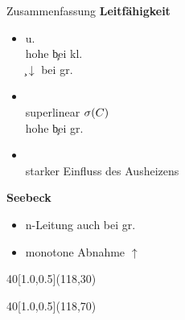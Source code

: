 \begin{frame}{Zusammenfassung}{}%
{\bfseries Leitfähigkeit}\par
\begin{itemize}
\item \CrPd u. \WPd 
\\hohe \c bei kl. \C
\\\c$\downarrow$ bei gr. \C
%
\item \dmbi \\superlinear $\c(\C)$ \\ hohe \c bei gr. \C
\item \aob \\ starker Einfluss des Ausheizens
\end{itemize}
%
\vspace*{1ex}
{\bfseries Seebeck}\par
\begin{itemize}
\item n-Leitung auch bei gr. \C
\item monotone Abnahme \Pfeil \n $\uparrow$
\end{itemize}
%
\begin{textblock}{40}[1.0,0.5](118,30)%
\end{textblock}
%
\begin{textblock}{40}[1.0,0.5](118,70)%
\end{textblock}
\end{frame}

